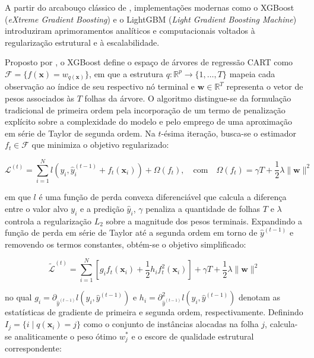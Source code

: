 A partir do arcabouço clássico de , implementações modernas como o XGBoost (\textit{eXtreme Gradient Boosting}) e o LightGBM (\textit{Light Gradient Boosting Machine}) introduziram aprimoramentos analíticos e computacionais voltados à regularização estrutural e à escalabilidade.

Proposto por , o XGBoost define o espaço de árvores de regressão \gls{CART} como $\mathcal{F} = \{f(\mathbf{x}) = w_{q(\mathbf{x})}\}$, em que a estrutura $q: \mathbb{R}^p \to \{1, \dots, T\}$ mapeia cada observação ao índice de seu respectivo nó terminal e $\mathbf{w} \in \mathbb{R}^T$ representa o vetor de pesos associados às $T$ folhas da árvore. O algoritmo distingue-se da formulação tradicional de primeira ordem pela incorporação de um termo de penalização explícito sobre a complexidade do modelo e pelo emprego de uma aproximação em série de Taylor de segunda ordem. Na $t$-ésima iteração, busca-se o estimador $f_t \in \mathcal{F}$ que minimiza o objetivo regularizado:

\begin{equation}
    \mathcal{L}^{(t)} = \sum_{i=1}^{N} l\left(y_i, \hat{y}_i^{(t-1)} + f_t(\mathbf{x}_i)\right) + \Omega(f_t), \quad \text{com} \quad \Omega(f_t) = \gamma T + \frac{1}{2}\lambda \|\mathbf{w}\|^2 \label{eq:obj_xgboost}
\end{equation}

\noindent em que $l$ é uma função de perda convexa diferenciável que calcula a diferença entre o valor alvo $y_i$ e a predição $\hat{y}_i$, $\gamma$ penaliza a quantidade de folhas $T$ e $\lambda$ controla a regularização $L_2$ sobre a magnitude dos pesos terminais. Expandindo a função de perda em série de Taylor até a segunda ordem em torno de $\hat{y}^{(t-1)}$ e removendo os termos constantes, obtém-se o objetivo simplificado:

\begin{equation}
    \tilde{\mathcal{L}}^{(t)} = \sum_{i=1}^{N} \left[ g_i f_t(\mathbf{x}_i) + \frac{1}{2} h_i f_t^2(\mathbf{x}_i) \right] + \gamma T + \frac{1}{2}\lambda \|\mathbf{w}\|^2 \label{eq:taylor_xgboost}
\end{equation}

\noindent no qual $g_i = \partial_{\hat{y}^{(t-1)}} l(y_i, \hat{y}^{(t-1)})$ e $h_i = \partial^2_{\hat{y}^{(t-1)}} l(y_i, \hat{y}^{(t-1)})$ denotam as estatísticas de gradiente de primeira e segunda ordem, respectivamente. Definindo $I_j = \{i \mid q(\mathbf{x}_i) = j\}$ como o conjunto de instâncias alocadas na folha $j$, calcula-se analiticamente o peso ótimo $w_j^*$ e o escore de qualidade estrutural correspondente:

